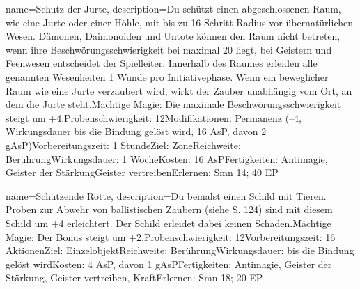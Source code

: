 {
    name={Schutz der Jurte},
    description={Du schützt einen abgeschlossenen Raum, wie eine Jurte oder einer Höhle, mit bis zu 16 Schritt Radius vor übernatürlichen Wesen. Dämonen, Daimonoiden und Untote können den Raum nicht betreten, wenn ihre Beschwörungsschwierigkeit bei maximal 20 liegt, bei Geistern und Feenwesen entscheidet der Spielleiter. Innerhalb des Raumes erleiden alle genannten Wesenheiten 1 Wunde pro Initiativephase. Wenn ein beweglicher Raum wie eine Jurte verzaubert wird, wirkt der Zauber unabhängig vom Ort, an dem die Jurte steht.\newline Mächtige Magie: Die maximale Beschwörungsschwierigkeit steigt um +4.\newline Probenschwierigkeit: 12\newline Modifikationen: Permanenz (–4, Wirkungsdauer bis die Bindung gelöst wird, 16 AsP, davon 2 gAsP)\newline Vorbereitungszeit: 1 Stunde\newline Ziel: Zone\newline Reichweite: Berührung\newline Wirkungsdauer: 1 Woche\newline Kosten: 16 AsP\newline Fertigkeiten: Antimagie, Geister der Stärkung\newline Geister vertreiben\newline Erlernen: Smn 14; 40 EP}
}


{
    name={Schützende Rotte},
    description={Du bemalst einen Schild mit Tieren. Proben zur Abwehr von ballistischen Zaubern (siehe S. 124) sind mit diesem Schild um +4 erleichtert. Der Schild erleidet dabei keinen Schaden.\newline Mächtige Magie: Der Bonus steigt um +2.\newline Probenschwierigkeit: 12\newline Vorbereitungszeit: 16 Aktionen\newline Ziel: Einzelobjekt\newline Reichweite: Berührung\newline Wirkungsdauer: bis die Bindung gelöst wird\newline Kosten: 4 AsP, davon 1 gAsP\newline Fertigkeiten: Antimagie, Geister der Stärkung, Geister vertreiben, Kraft\newline Erlernen: Smn 18; 20 EP}
}


